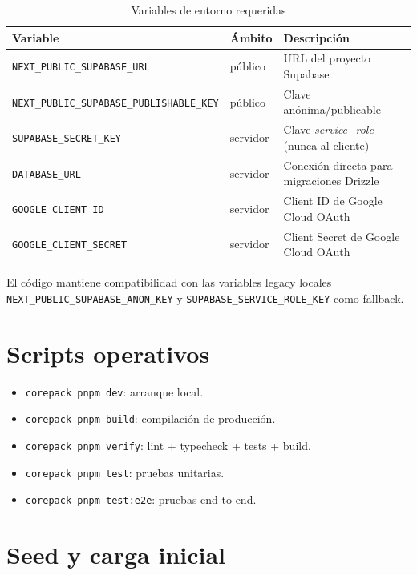 \documentclass[12pt,a4paper,oneside]{report}
\newcommand{\file}[1]{\texttt{\color{cecyteDark}#1}}
\begin{document}
\begin{table}[H]
\centering
\caption{Variables de entorno requeridas}
\begin{tabular}{@{}L{5.5cm}L{3cm}L{7cm}@{}}
\toprule
{}
\textbf{Variable} & \textbf{Ámbito} & \textbf{Descripción} \\
\midrule
\file{NEXT\_PUBLIC\_SUPABASE\_URL}              & público     & URL del proyecto Supabase \\
\file{NEXT\_PUBLIC\_SUPABASE\_PUBLISHABLE\_KEY} & público     & Clave anónima/publicable \\
\file{SUPABASE\_SECRET\_KEY}                    & servidor    & Clave \textit{service\_role} (nunca al cliente) \\
\file{DATABASE\_URL}                            & servidor    & Conexión directa para migraciones Drizzle \\
\file{GOOGLE\_CLIENT\_ID}                       & servidor    & Client ID de Google Cloud OAuth \\
\file{GOOGLE\_CLIENT\_SECRET}                   & servidor    & Client Secret de Google Cloud OAuth \\
\bottomrule
\end{tabular}
\end{table}

El código mantiene compatibilidad con las variables legacy locales \file{NEXT\_PUBLIC\_SUPABASE\_ANON\_KEY} y \file{SUPABASE\_SERVICE\_ROLE\_KEY} como fallback.

\section{Scripts operativos}

\begin{itemize}
  \item \file{corepack pnpm dev}: arranque local.
  \item \file{corepack pnpm build}: compilación de producción.
  \item \file{corepack pnpm verify}: lint + typecheck + tests + build.
  \item \file{corepack pnpm test}: pruebas unitarias.
  \item \file{corepack pnpm test:e2e}: pruebas end-to-end.
\end{itemize}

\section{Seed y carga inicial}
\end{document}

